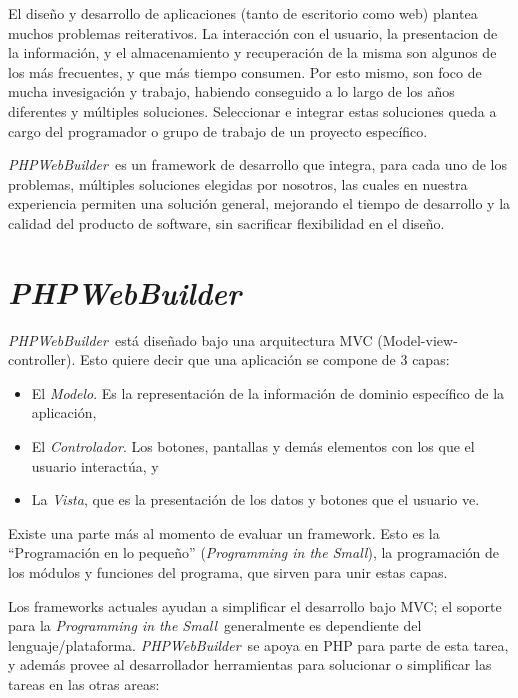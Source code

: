 \documentclass[a4paper,10pt]{article}
\newcommand{\PITS}{\emph{Programming in the Small}} %
\newcommand{\PWB}{\emph{PHPWebBuilder}}
\begin{document}
El diseño y desarrollo de aplicaciones (tanto de escritorio como web) plantea muchos problemas reiterativos. La interacción con el usuario, la presentacion de la información, y el almacenamiento y recuperación de la misma son algunos de los más frecuentes, y que más tiempo consumen.
Por esto mismo, son foco de mucha invesigación y trabajo, habiendo conseguido a lo largo de los años diferentes y múltiples soluciones. Seleccionar e integrar estas soluciones queda a cargo del programador o grupo de trabajo de un proyecto específico.

\PWB \ es un framework de desarrollo que integra, para cada uno de los problemas, múltiples soluciones elegidas por nosotros, las cuales en nuestra experiencia permiten una solución general, mejorando el tiempo de desarrollo y la calidad del producto de software, sin sacrificar flexibilidad en el diseño.

\section{\PWB}

\PWB \ está diseñado bajo una arquitectura MVC \cite{mvc} (Model-view-controller).
Esto quiere decir que una aplicación se compone de 3 capas:
\begin{itemize}
\item El \emph{Modelo}. Es la representación de la información de dominio específico de la aplicación,
\item El \emph{Controlador}. Los botones, pantallas y demás elementos con los que el usuario interactúa, y
\item La \emph{Vista}, que es la presentación de los datos y botones que el usuario ve.
\end{itemize}

Existe una parte más al momento de evaluar un framework. Esto es la ``Programación en lo pequeño'' (\PITS), la programación de los módulos y funciones del programa, que sirven para unir estas capas.

Los frameworks actuales ayudan a simplificar el desarrollo bajo MVC; el soporte para la \PITS \ generalmente es dependiente del lenguaje/plataforma. \PWB \ se apoya en PHP para parte de esta tarea, y además provee al desarrollador herramientas para solucionar o simplificar las tareas en las otras areas:
\end{document}
